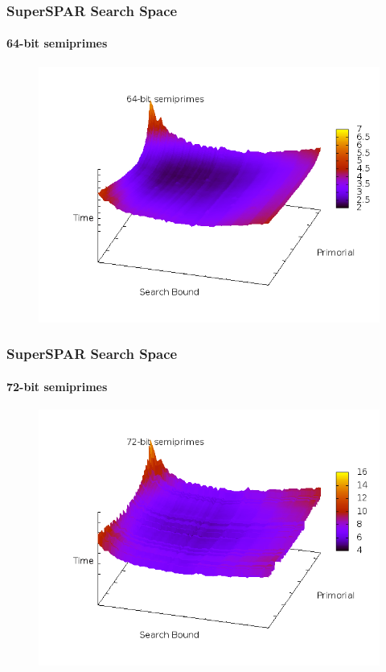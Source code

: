 \documentclass{beamer}
\begin{document}
\begin{frame}
\frametitle{SuperSPAR Search Space}
\framesubtitle{64-bit semiprimes}
\begin{figure}
\includegraphics[scale=0.47]{bits-64-3d.png}
\end{figure}
\end{frame}
\begin{frame}
\frametitle{SuperSPAR Search Space}
\framesubtitle{72-bit semiprimes}
\begin{figure}
\includegraphics[scale=0.47]{bits-72-3d.png}
\end{figure}
\end{frame}
\end{document}
